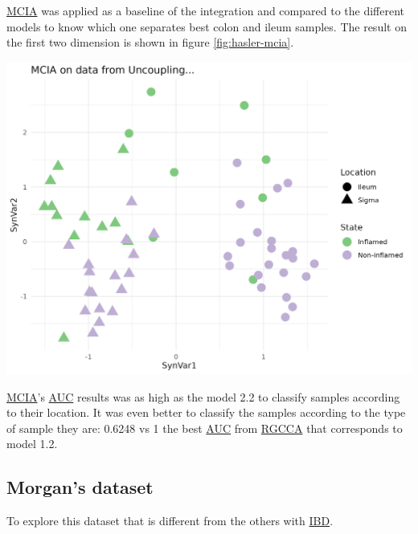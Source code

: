 \documentclass[
  12pt,
  a4paper,
  twoside,
  openright]{book}
\let\origfigure\figure
\let\endorigfigure\endfigure
\renewenvironment{figure}[1][2] {
    \expandafter\origfigure\expandafter[!htbp]
} {
    \endorigfigure
}
\begin{document}
\protect\hyperlink{acronyms_MCIA}{MCIA} was applied as a baseline of the integration and compared to the different models to know which one separates best colon and ileum samples.
The result on the first two dimension is shown in figure \ref{fig:hasler-mcia}.

\begin{figure}
\includegraphics[width=1\linewidth]{images/hasler-mcia} \caption[MCIA dimensions in the Häsler dataset.]{MCIA dimensions in the Häsler dataset. MCIA first two dimensions of the dataset shows two vertical groups on the first syntethic dimension according to the location of the samples and colored by the state. Each point represents a sample (colored by location and shape by State).}\label{fig:hasler-mcia}
\end{figure}

\protect\hyperlink{acronyms_MCIA}{MCIA}'s \protect\hyperlink{acronyms_AUC}{AUC} results was as high as the model 2.2 to classify samples according to their location.
It was even better to classify the samples according to the type of sample they are: 0.6248 vs 1 the best \protect\hyperlink{acronyms_AUC}{AUC} from \protect\hyperlink{acronyms_RGCCA}{RGCCA} that corresponds to model 1.2.

\FloatBarrier

\hypertarget{results-morgan}{%
\subsection{Morgan's dataset}\label{results-morgan}}

To explore this dataset that is different from the others with \protect\hyperlink{acronyms_IBD}{IBD}.
\end{document}
